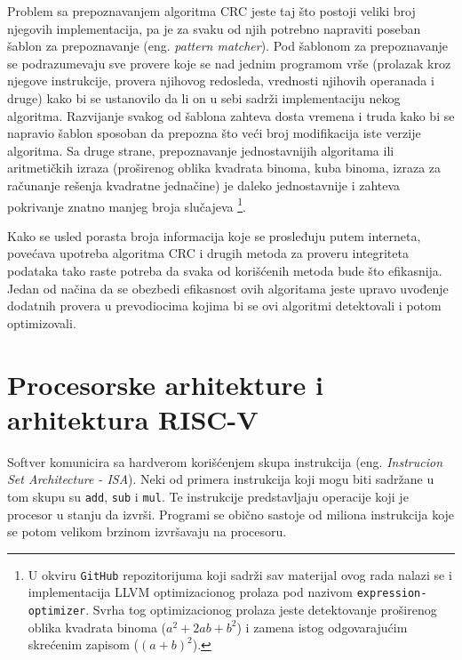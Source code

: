 \documentclass[12pt,oneside]{memoir}
\begin{document}
Problem sa prepoznavanjem algoritma CRC jeste taj što postoji veliki broj njegovih implementacija, pa je za svaku od njih potrebno napraviti poseban šablon za prepoznavanje (eng. \textit{pattern matcher}). Pod šablonom za prepoznavanje se podrazumevaju sve provere koje se nad jednim programom vrše (prolazak kroz njegove instrukcije, provera njihovog redosleda, vrednosti njihovih operanada i druge) kako bi se ustanovilo da li on u sebi sadrži implementaciju nekog algoritma. 
Razvijanje svakog od šablona zahteva dosta vremena i truda kako bi se napravio šablon sposoban da prepozna što veći broj modifikacija iste verzije algoritma. 
Sa druge strane, prepoznavanje jednostavnijih algoritama ili aritmetičkih izraza (proširenog oblika kvadrata binoma, kuba binoma, izraza za računanje rešenja kvadratne jednačine) je daleko jednostavnije i zahteva pokrivanje znatno manjeg broja slučajeva
\footnote{U okviru \texttt{GitHub} repozitorijuma koji sadrži sav materijal ovog rada nalazi se i implementacija LLVM optimizacionog prolaza pod nazivom \texttt{expression-optimizer}. Svrha tog optimizacionog prolaza jeste detektovanje proširenog oblika kvadrata binoma ($a^2 + 2ab + b^2$) i zamena istog odgovarajućim skrećenim zapisom ($(a + b)^2$).}.
 

Kako se usled porasta broja informacija koje se prosleđuju putem interneta, povećava upotreba algoritma CRC i drugih metoda za proveru integriteta podataka tako raste potreba da svaka od korišćenih metoda bude što efikasnija. Jedan od načina da se obezbedi efikasnost ovih algoritama jeste upravo uvođenje dodatnih provera u prevodiocima kojima bi se ovi algoritmi detektovali i potom optimizovali.



\chapter{Procesorske arhitekture i arhitektura RISC-V}
\label{chap:riscv}
Softver komunicira sa hardverom korišćenjem skupa instrukcija (eng. \textit{Instrucion Set Architecture - ISA}). Neki od primera instrukcija koji mogu biti sadržane u tom skupu su \texttt{add}, \texttt{sub} i \texttt{mul}. Te instrukcije predstavljaju operacije koji je procesor u stanju da izvrši. Programi se obično sastoje od miliona instrukcija koje se potom velikom brzinom izvršavaju na procesoru. 
\end{document}
